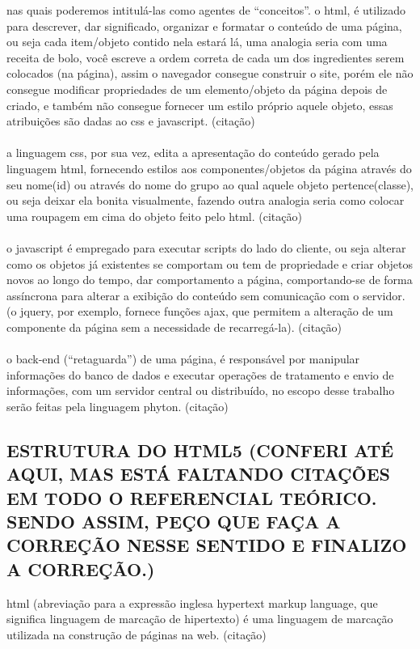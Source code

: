 \begin{description}
			nas quais poderemos intitulá-las como agentes de “conceitos”.  
			o html, é utilizado para descrever, dar significado, organizar e formatar o conteúdo de uma página, ou seja cada item/objeto contido nela estará lá, uma analogia seria com uma receita de bolo, você escreve a ordem correta de cada um dos ingredientes serem colocados (na página), assim o navegador consegue construir o site, porém ele não consegue modificar propriedades de um elemento/objeto da página depois de criado, e também não consegue fornecer um estilo próprio aquele objeto, essas atribuições são dadas ao css e javascript. (citação)\\\\			
			a linguagem css, por sua vez, edita a apresentação do conteúdo gerado pela linguagem html, fornecendo estilos aos componentes/objetos da página através do seu nome(id) ou através do nome do grupo ao qual aquele objeto pertence(classe), ou seja deixar ela bonita visualmente, fazendo outra analogia seria como colocar uma roupagem em cima do objeto feito pelo html. (citação)\\\\			
			o javascript é empregado para executar scripts do lado do cliente, ou seja alterar como os objetos já existentes se comportam ou tem de propriedade e criar objetos novos ao longo do tempo, dar comportamento a página, comportando-se de forma assíncrona para alterar a exibição do conteúdo sem comunicação com o servidor. (o jquery, por exemplo, fornece funções ajax, que permitem a alteração de um componente da página sem a necessidade de recarregá-la). (citação)\\\\		
			o back-end (“retaguarda”) de uma página, é responsável por manipular informações do banco de dados e executar operações de tratamento e envio de informações, com um servidor central ou distribuído, no escopo desse trabalho serão feitas pela linguagem phyton. (citação)				
	\end{description} 	
	  
	\subsection{ESTRUTURA DO HTML5 (CONFERI ATÉ AQUI, MAS ESTÁ FALTANDO CITAÇÕES EM TODO O REFERENCIAL TEÓRICO. SENDO ASSIM, PEÇO QUE FAÇA A CORREÇÃO NESSE SENTIDO E FINALIZO A CORREÇÃO.)}
	\label{subsec:ESTRUTURAHTML5}
	
	html (abreviação para a expressão inglesa hypertext markup language, que significa linguagem de marcação de hipertexto) é uma linguagem de marcação utilizada na construção de páginas na web.  (citação) 
	
